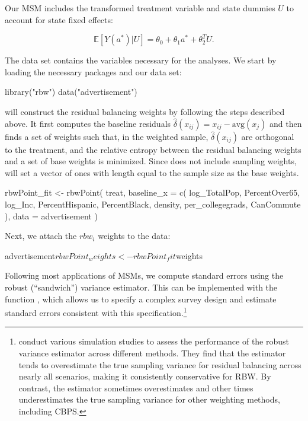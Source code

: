 Our MSM includes the transformed treatment variable and state dummies
\(U\) to account for state fixed effects:

\begin{equation}
\label{eq:12}
\mathbb{E}[Y(a^{*})|U]=\theta_{0}+\theta_{1}a^{*} +\theta_{2}^{T}U.
\end{equation}

The data set  contains the variables necessary for
the analyses. We start by loading the necessary packages and our data
set:

\begin{Schunk}
\begin{Sinput}
library("rbw")
data("advertisement")
\end{Sinput}
\end{Schunk}

 will construct the residual balancing weights by
following the steps described above. It first computes the baseline
residuals \(\hat{\delta}(x_{ij})=x_{ij}-\text{avg}({x}_{j})\) and then
finds a set of weights such that, in the weighted sample,
\(\hat{\delta}(x_{ij})\) are orthogonal to the treatment, and the
relative entropy between the residual balancing weights and a set of
base weights is minimized. Since  does not include
sampling weights,  will set a vector of ones with
length equal to the sample size as the base weights.

\begin{Schunk}
\begin{Sinput}
rbwPoint_fit <-
  rbwPoint(
    treat,
    baseline_x = c(
      log_TotalPop,
      PercentOver65,
      log_Inc,
      PercentHispanic,
      PercentBlack,
      density,
      per_collegegrads,
      CanCommute
    ),
    data =
      advertisement
  )
\end{Sinput}
\end{Schunk}

Next, we attach the \(rbw_{i}\) weights to the data:

\begin{Schunk}
\begin{Sinput}
advertisement$rbwPoint_weights <- rbwPoint_fit$weights
\end{Sinput}
\end{Schunk}

Following most applications of MSMs, we compute standard errors using
the robust (``sandwich'') variance estimator. This can be implemented
with the function , which allows us to specify
a complex survey design and estimate standard errors consistent with
this specification.\footnote{\citet{zhouResidualBalancingMethod2020a}
  conduct various simulation studies to assess the performance of the
  robust variance estimator across different methods. They find that the
  estimator tends to overestimate the true sampling variance for
  residual balancing across nearly all scenarios, making it consistently
  conservative for RBW. By contrast, the estimator sometimes
  overestimates and other times underestimates the true sampling
  variance for other weighting methods, including CBPS.}

